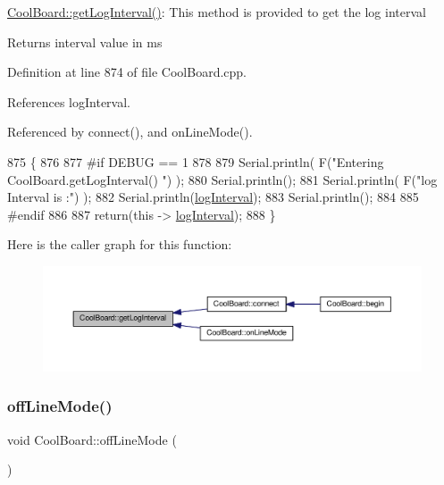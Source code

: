 \hyperlink{classCoolBoard_aaa24480b273fc095a1356a589c333781}{Cool\+Board\+::get\+Log\+Interval()}\+: This method is provided to get the log interval

\begin{DoxyReturn}{Returns}
interval value in ms 
\end{DoxyReturn}


Definition at line 874 of file Cool\+Board.\+cpp.



References log\+Interval.



Referenced by connect(), and on\+Line\+Mode().


\begin{DoxyCode}
875 \{
876 
877 \textcolor{preprocessor}{#if DEBUG == 1}
878 
879     Serial.println( F(\textcolor{stringliteral}{"Entering CoolBoard.getLogInterval() "}) );
880     Serial.println();
881     Serial.println( F(\textcolor{stringliteral}{"log Interval is :"}) );
882     Serial.println(\hyperlink{classCoolBoard_a4de0096d575d66b472c4c1f0111fd452}{logInterval});
883     Serial.println();
884 
885 \textcolor{preprocessor}{#endif}
886 
887     \textcolor{keywordflow}{return}(\textcolor{keyword}{this} -> \hyperlink{classCoolBoard_a4de0096d575d66b472c4c1f0111fd452}{logInterval});
888 \}
\end{DoxyCode}
Here is the caller graph for this function\+:
\nopagebreak
\begin{figure}[H]
\begin{center}
\leavevmode
\includegraphics[width=350pt]{classCoolBoard_aaa24480b273fc095a1356a589c333781_icgraph}
\end{center}
\end{figure}
\mbox{\label{classCoolBoard_ae6b5e1274d760462290192acea4adca8}} 
\subsubsection{\texorpdfstring{off\+Line\+Mode()}{offLineMode()}}
{\footnotesize\ttfamily void Cool\+Board\+::off\+Line\+Mode (\begin{DoxyParamCaption}{ }\end{DoxyParamCaption})}

